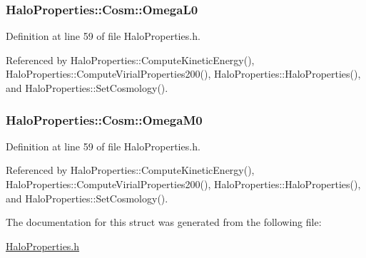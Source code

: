\subsubsection[{OmegaL0}]{ {\bf HaloProperties::Cosm::OmegaL0}}\label{structHaloProperties_1_1Cosm_a8f7218daf6563a00cc4560fdd389d104}


Definition at line 59 of file HaloProperties.h.



Referenced by HaloProperties::ComputeKineticEnergy(), HaloProperties::ComputeVirialProperties200(), HaloProperties::HaloProperties(), and HaloProperties::SetCosmology().

\subsubsection[{OmegaM0}]{ {\bf HaloProperties::Cosm::OmegaM0}}\label{structHaloProperties_1_1Cosm_a04365f2d2c6e73214753d69c700fc4ee}


Definition at line 59 of file HaloProperties.h.



Referenced by HaloProperties::ComputeKineticEnergy(), HaloProperties::ComputeVirialProperties200(), HaloProperties::HaloProperties(), and HaloProperties::SetCosmology().



The documentation for this struct was generated from the following file:\begin{DoxyCompactItemize}
\item 
\hyperlink{HaloProperties_8h}{HaloProperties.h}\end{DoxyCompactItemize}
